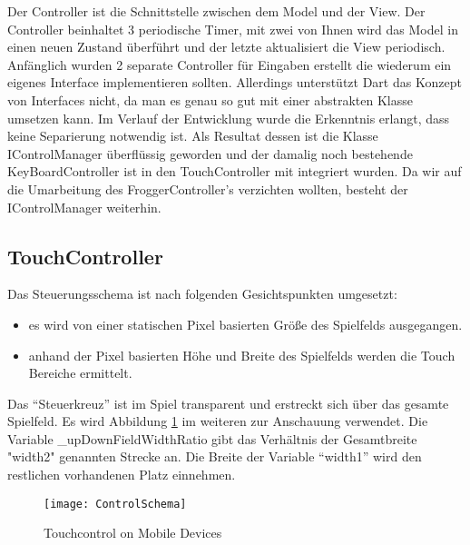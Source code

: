 \documentclass[a4paper,10pt]{report}
\begin{document}
    {
    	\label{sec:controller}
    	
    	Der Controller ist die Schnittstelle zwischen dem Model und der View. Der Controller beinhaltet 3 periodische Timer, mit zwei von Ihnen wird das Model 
    	in einen neuen Zustand überführt und der letzte aktualisiert die View periodisch.
    	\newline \newline
    	\noindent
		Anfänglich wurden 2 separate Controller für Eingaben erstellt die wiederum ein eigenes Interface implementieren sollten. Allerdings unterstützt Dart das Konzept 
		von Interfaces nicht, da man es genau so gut mit einer abstrakten Klasse umsetzen kann. Im Verlauf der Entwicklung wurde die Erkenntnis erlangt, dass keine Separierung
		notwendig ist. Als Resultat dessen ist die Klasse IControlManager überflüssig geworden und der damalig noch bestehende KeyBoardController ist in den TouchController mit integriert wurden.
		Da wir auf die Umarbeitung des FroggerController's verzichten wollten, besteht der IControlManager weiterhin.
		    	
    	
		\subsection{TouchController}
		{
			\label{ssec:touchcontroller}
			
			Das Steuerungsschema ist nach folgenden Gesichtspunkten umgesetzt:
			\begin{itemize}
				\item es wird von einer statischen Pixel basierten Größe des Spielfelds ausgegangen.
				\item anhand der Pixel basierten Höhe und Breite des Spielfelds werden die Touch Bereiche ermittelt.
			\end{itemize}					
					
			\noindent	
			Das “Steuerkreuz” ist im Spiel transparent und erstreckt sich über das gesamte Spielfeld.
			Es wird Abbildung \ref{fig:touchcontrolschema} im weiteren zur Anschauung verwendet.
			\newline \newline
			Die Variable \_upDownFieldWidthRatio gibt das Verhältnis der Gesamtbreite "width2" genannten Strecke an. 
			Die Breite der Variable “width1” wird den restlichen vorhandenen Platz einnehmen.

			\begin{figure}			
				\texttt{[image: ControlSchema]}
				\caption{Touchcontrol on Mobile Devices}
				\label{fig:touchcontrolschema}
			\end{figure}
			
}}
\end{document}
